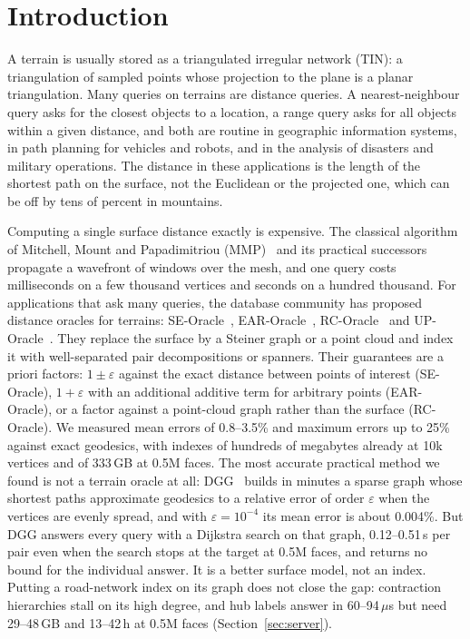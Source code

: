 \documentclass[sigconf,nonacm,screen]{acmart}
\newcommand{\eps}{\varepsilon}
\begin{document}
\section{Introduction}

A terrain is usually stored as a triangulated irregular network (TIN): a triangulation of sampled
points whose projection to the plane is a planar triangulation. Many queries on terrains are distance
queries. A nearest-neighbour query asks for the closest objects to a location, a range query asks for all
objects within a given distance, and both are routine in geographic information systems, in path
planning for vehicles and robots, and in the analysis of disasters and military operations. The distance
in these applications is the length of the shortest path on the surface, not the Euclidean or
the projected one, which can be off by tens of percent in mountains.

Computing a single surface distance exactly is expensive. The classical algorithm of Mitchell, Mount and
Papadimitriou (MMP)~\cite{mitchell1987discrete} and its practical successors~\cite{surazhsky2005fast,
xin2009improving,qin2016fast} propagate a wavefront of windows over the mesh, and one query costs
milliseconds on a few thousand vertices and seconds on a hundred thousand. For applications that ask many
queries, the database community has proposed distance oracles for terrains: SE-Oracle~\cite{wei2017distance},
EAR-Oracle~\cite{huang2023ear}, RC-Oracle~\cite{yan2024rc} and UP-Oracle~\cite{yan2025up}. They replace the
surface by a Steiner graph or a point cloud and index it with well-separated pair decompositions or spanners.
Their guarantees are a priori factors: $1\pm\eps$ against the exact distance between points of interest
(SE-Oracle), $1+\eps$ with an additional additive term for arbitrary points (EAR-Oracle), or a factor against a
point-cloud graph rather than the surface (RC-Oracle). We measured mean errors of 0.8--3.5\% and maximum errors
up to 25\% against exact geodesics, with indexes of hundreds of megabytes already at 10k vertices and of
333\,GB at 0.5M faces.
The most accurate practical method we found is not a terrain oracle at all: DGG~\cite{adikusuma2020fast} builds in
minutes a sparse graph whose shortest paths approximate geodesics to a relative error of order $\eps$ when the
vertices are evenly spread, and with $\eps=10^{-4}$ its mean error is about 0.004\%. But DGG answers every query
with a Dijkstra search on that graph, 0.12--0.51\,s per pair even when the search stops at the target at 0.5M
faces, and returns no bound for the individual answer. It is a better surface model, not an index. Putting a road-network index on
its graph does not close the gap: contraction hierarchies stall on its high degree, and hub labels answer in
60--94\,$\mu$s but need 29--48\,GB and 13--42\,h at 0.5M faces (Section~\ref{sec:server}).
\end{document}
